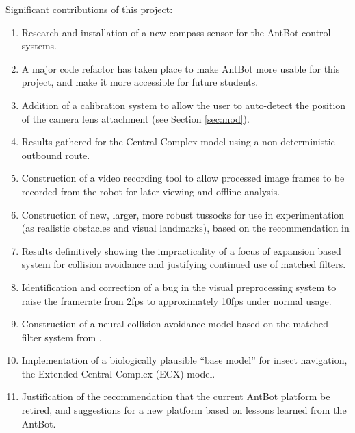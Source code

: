 \documentclass[a4paper,11pt,twoside,openright]{article}
\begin{document}
Significant contributions of this project:
\begin{enumerate}
\item{
  Research and installation of a new compass sensor for the AntBot control
  systems.
}

\item{
  A major code refactor has taken place to make AntBot more usable for this
  project, and make it more accessible for future students.
}

\item{
  Addition of a calibration system to allow the user to auto-detect the position
  of the camera lens attachment (see Section \ref{sec:mod}).
}

\item{
  Results gathered for the Central Complex model using a non-deterministic
  outbound route.
}

\item{
  Construction of a video recording tool to allow processed
  image frames to be recorded from the robot for later viewing and
  offline analysis.
}

\item{ Construction of new, larger, more robust tussocks for use in
  experimentation (as realistic obstacles and visual landmarks), based
  on the recommendation in \cite{Mitchell2018}}

\item{ Results definitively showing the impracticality of a focus of
    expansion based system for collision avoidance and justifying
    continued use of matched filters.
}

\item{ Identification and correction of a bug in the visual preprocessing system
  to raise the framerate from 2fps to approximately 10fps under normal usage.}

\item{ Construction of a neural collision avoidance model based on the
  matched filter system from \cite{Mitchell2018, Stewart2010}. }


\item{
  Implementation of a biologically plausible ``base model'' for
  insect navigation, the Extended Central Complex (ECX) model.
}

\item{
  Justification of the recommendation that the current AntBot platform
  be retired, and suggestions for a new platform based on lessons
  learned from the AntBot.
}

\end{enumerate}
\newpage
\end{document}
